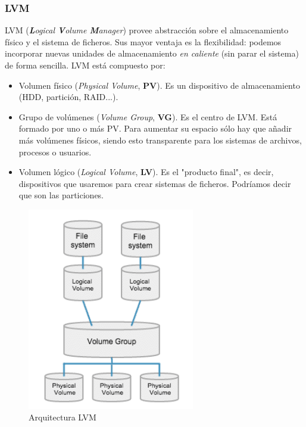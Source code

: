 \documentclass[12pt,spanish]{article}
\begin{document}
\newpage

\subsubsection{LVM}
LVM (\textit{\textbf{L}ogical \textbf{V}olume \textbf{M}anager}) provee abstracción sobre el almacenamiento físico y el sistema de ficheros. Sus mayor ventaja es la flexibilidad: podemos incorporar nuevas unidades de almacenamiento \textit{en caliente} (sin parar el sistema) de forma sencilla. LVM está compuesto por:
\begin{itemize}
  \item Volumen físico (\textit{Physical Volume}, \textbf{PV}). Es un dispositivo de almacenamiento (HDD, partición, RAID...).
  \item Grupo de volúmenes (\textit{Volume Group}, \textbf{VG}). Es el centro de LVM. Está formado por uno o más PV. Para aumentar su espacio sólo hay que añadir más volúmenes físicos, siendo esto transparente para los sistemas de archivos, procesos o usuarios.
  \item Volumen lógico (\textit{Logical Volume}, \textbf{LV}). Es el "producto final", es decir, dispositivos que usaremos para crear sistemas de ficheros. Podríamos decir que son las particiones.
\end{itemize}

\begin{figure}[H]
  \centering
  \includegraphics[width=0.65\textwidth]{lvm.png}
  \caption{Arquitectura LVM}
\end{figure}
\newpage
\end{document}
